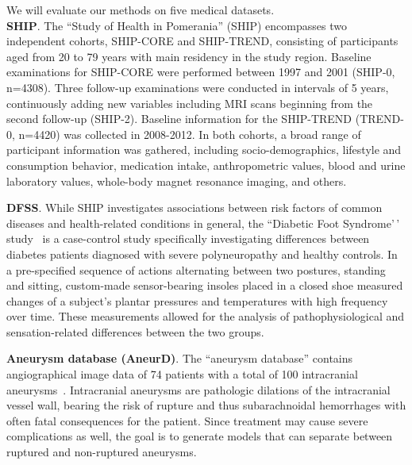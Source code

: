 \documentclass[
]{book}
\begin{document}
We will evaluate our methods on five medical datasets.\\
\textbf{SHIP}. The ``Study of Health in Pomerania'' (SHIP) \autocite{Voelzke:SHIP11} encompasses two independent cohorts, SHIP-CORE and SHIP-TREND, consisting of participants aged from 20 to 79 years with main residency in the study region.
Baseline examinations for SHIP-CORE were performed between 1997 and 2001 (SHIP-0, n=4308). Three follow-up examinations were conducted in intervals of 5 years, continuously adding new variables including MRI scans beginning from the second follow-up (SHIP-2).
Baseline information for the SHIP-TREND (TREND-0, n=4420) was collected in 2008-2012.
In both cohorts, a broad range of participant information was gathered, including socio-demographics, lifestyle and consumption behavior, medication intake, anthropometric values, blood and urine laboratory values, whole-body magnet resonance imaging, and others.

\textbf{DFSS}. While SHIP investigates associations between risk factors of common diseases and health-related conditions in general, the ``Diabetic Foot Syndrome'\,' study~\autocite{Niemann:PONE2016,Niemann:EBioMedicine2020} is a case-control study specifically investigating differences between diabetes patients diagnosed with severe polyneuropathy and healthy controls.
In a pre-specified sequence of actions alternating between two postures, standing and sitting, custom-made sensor-bearing insoles placed in a closed shoe measured changes of a subject's plantar pressures and temperatures with high frequency over time.
These measurements allowed for the analysis of pathophysiological and sensation-related differences between the two groups.

\textbf{Aneurysm database (AneurD)}. The ``aneurysm database'' contains angiographical image data of 74 patients with a total of 100 intracranial aneurysms~\autocite{Niemann:CBMS2018}.
Intracranial aneurysms are pathologic dilations of the intracranial vessel wall, bearing the risk of rupture and thus subarachnoidal hemorrhages with often fatal consequences for the patient.
Since treatment may cause severe complications as well, the goal is to generate models that can separate between ruptured and non-ruptured aneurysms.
\end{document}
